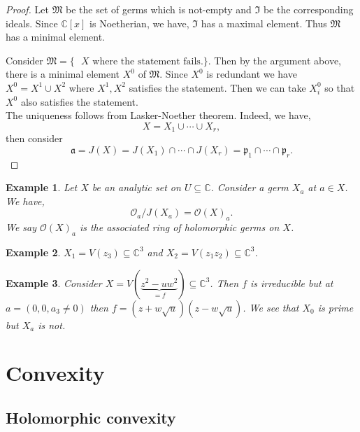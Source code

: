 \documentclass{article}
\newtheorem{example}{Example}[section]
\newcommand{\C}[0]{\mathbb{C}}
\newcommand{\Ouv}[0]{\mathcal{O}}
\begin{document}
\begin{proof}
  Let $\mathfrak{M}$ be the set of germs which is not-empty and $\mathfrak{I}$ be the corresponding ideals. Since $\C[x]$ is Noetherian, we have, $\mathfrak{I}$ has a maximal element. Thus $\mathfrak{M}$ has a minimal element.
  \par Consider $\mathfrak{M}=\{\text{ $X$ where the statement fails.}\}$. Then by the argument above, there is  a minimal element $X^0$ of $\mathfrak{M}$. Since $X^0$ is redundant we have $X^0 = X^1\cup X^2$ where $X^1,X^2$ satisfies the statement. 
  Then we can take $X_i^0$ so that $X^0$ also satisfies the statement. \\
  The uniqueness follows from Lasker-Noether theorem. Indeed, we have,
  \begin{equation*}
    X = X_1\cup\cdots\cup X_r,
  \end{equation*}
  then consider 
  \begin{equation*}
    \mathfrak{a} = J(X) = J(X_1)\cap\cdots\cap J(X_r) = \mathfrak{p}_1\cap\cdots\cap\mathfrak{p}_r.
  \end{equation*}
\end{proof}

\begin{example}
  Let $X$ be an analytic set on $U\subseteq \C$. Consider a germ $X_a$ at $a\in X$. We have,
  \begin{equation*}
    \Ouv_a/J(X_a) = \Ouv(X)_a.
  \end{equation*}
  We say $\Ouv(X)_a$ is the associated ring of holomorphic germs on $X$.
\end{example}
\begin{example}
  $X_1=V(z_3)\subseteq \C^3$ and $X_2 = V(z_1z_2)\subseteq \C^3$. 
\end{example}

\begin{example}
  Consider $X= V(\underbrace{z^2-uw^2}_{=f})\subseteq \C^3$. Then $f$ is irreducible but at $a=(0,0,a_3\not=0)$ then $f = (z+w\sqrt{u})(z-w\sqrt{u})$. We see that $X_0$ is prime but $X_a$ is not.
\end{example}

\section{Convexity}

\subsection{Holomorphic convexity}
\end{document}
